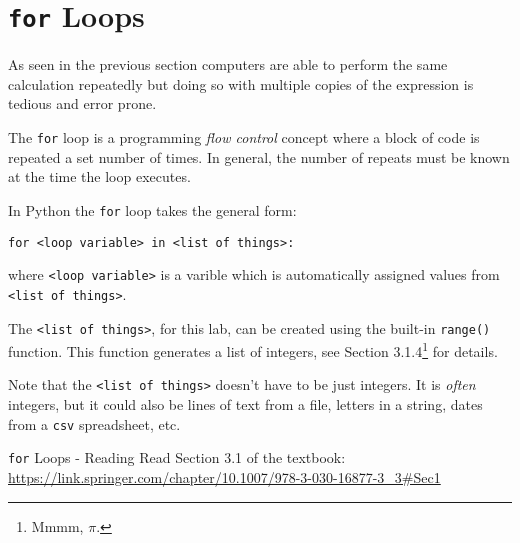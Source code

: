\documentclass{lab}
\begin{document}
\pagebreak

\section{\texttt{for} Loops}

As seen in the previous section computers are able to perform the same calculation repeatedly but doing so with multiple copies of the expression is tedious and error prone.

The \texttt{for} loop is a programming \textit{flow control} concept where a block of code is repeated a set number of times. In general, the number of repeats must be known at the time the loop executes.

In Python the \texttt{for} loop takes the general form:

\texttt{for <loop variable> in <list of things>:}

where \texttt{<loop variable>} is a varible which is automatically assigned values from \texttt{<list of things>}.

The \texttt{<list of things>}, for this lab, can be created using the built-in \texttt{range()} function. This function generates a list of integers, see Section 3.1.4\footnote{Mmmm, $\pi$.} for details.

Note that the \texttt{<list of things>} doesn't have to be just integers. It is \textit{often} integers, but it could also be lines of text from a file, letters in a string, dates from a \texttt{csv} spreadsheet, etc.

\begin{task}{\texttt{for} Loops - Reading}{}
Read Section 3.1 of the textbook: \url{https://link.springer.com/chapter/10.1007/978-3-030-16877-3_3#Sec1}
\end{task}
\end{document}

